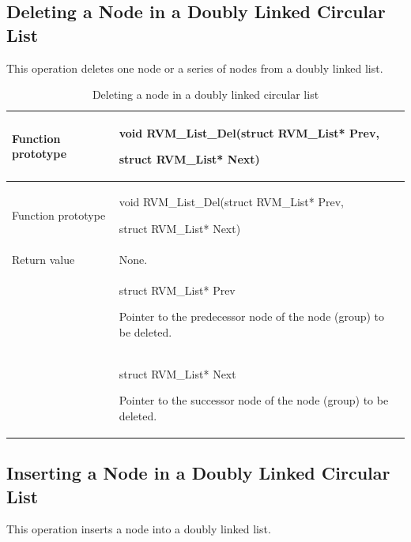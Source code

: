 \subsection{Deleting a Node in a Doubly Linked Circular List}\label{subsec:3-6-3}

This operation deletes one node or a series of nodes from a doubly linked list.

\begin{xltabular}{\textwidth}{@{}>{\hsize\raggedright\arraybackslash}X>{\hsize\raggedright\arraybackslash}X@{}}
\caption{Deleting a node in a doubly linked circular list}\label{tab:3-16}\\
\toprule
Function prototype\strut
 & void RVM\_\allowbreak{}List\_\allowbreak{}Del(struct RVM\_\allowbreak{}List* Prev,

struct RVM\_\allowbreak{}List* Next)\strut
\tabularnewline
\endfirsthead
\toprule
Function prototype\strut
 & void RVM\_\allowbreak{}List\_\allowbreak{}Del(struct RVM\_\allowbreak{}List* Prev,

struct RVM\_\allowbreak{}List* Next)\strut
\tabularnewline
\midrule
\endhead
\bottomrule
\endlastfoot
Return value & None.\tabularnewline
{} & struct RVM\_\allowbreak{}List* Prev

Pointer to the predecessor node of the node (group) to be deleted.\strut
\tabularnewline
\strut
 & struct RVM\_\allowbreak{}List* Next

Pointer to the successor node of the node (group) to be deleted.\strut
\tabularnewline
\end{xltabular}

\subsection{Inserting a Node in a Doubly Linked Circular List}\label{subsec:3-6-4}

This operation inserts a node into a doubly linked list.

